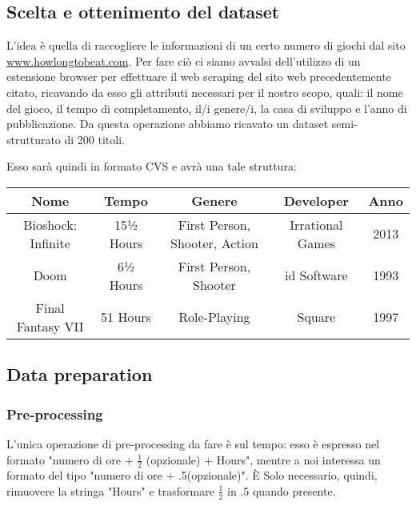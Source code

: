     \subsection{Scelta e ottenimento del dataset}
        L'idea è quella di raccogliere le informazioni di un certo numero di giochi dal sito \url{www.howlongtobeat.com}. Per fare ciò ci siamo avvalsi dell'utilizzo di un estensione browser per effettuare il web scraping del sito web precedentemente citato, ricavando da esso gli attributi necessari per il nostro scopo, quali: il nome del gioco, il tempo di completamento, il/i genere/i, la casa di sviluppo e l'anno di pubblicazione. Da questa operazione abbiamo ricavato un dataset semi-strutturato di 200 titoli.
        
        \newpage
        Esso sarà quindi in formato CVS e avrà una tale struttura:
        \begin{table}[h]
            \begin{tabular}{|c|c|c|c|c|}
            \hline
            \textbf{Nome} & \textbf{Tempo} & \textbf{Genere}               & \textbf{Developer} & \textbf{Anno} \\ \hline
            Bioshock: Infinite & 15½ Hours & First Person, Shooter, Action & Irrational Games & 2013\\ \hline
            Doom               & 6½ Hours       & First Person, Shooter         & id Software & 1993        \\ \hline
            Final Fantasy VII  & 51 Hours       & Role-Playing                  & Square & 1997             \\ \hline
            \end{tabular}
        \end{table}
        
    \subsection{Data preparation}
    
        \subsubsection{Pre-processing}
            L'unica operazione di pre-processing da fare è sul tempo: esso è espresso nel formato "numero di ore + $\frac{1}{2}$ (opzionale) + Hours", mentre a noi interessa un formato del tipo "numero di ore + .5(opzionale)". È Solo necessario, quindi, rimuovere la stringa "Hours" e trasformare $\frac{1}{2}$ in .5 quando presente.
        
